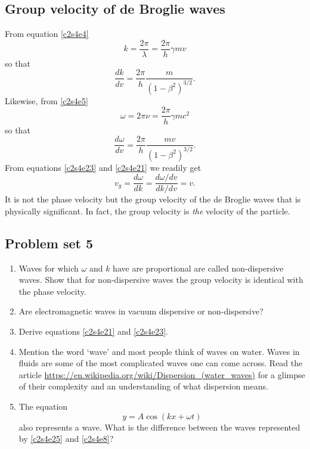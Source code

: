 \subsection{Group velocity of de Broglie waves}
From equation \eqref{c2s4e4}
\begin{equation}\label{c2s4e20}
k = \frac{2\pi}{\lambda} = \frac{2\pi}{h}\gamma mv
\end{equation}
so that
\begin{equation}\label{c2s4e21}
\frac{dk}{dv} = \frac{2\pi}{h}\frac{m}{(1 - \beta^2)^{3/2}}.
\end{equation}
Likewise, from \eqref{c2s4e5}
\begin{equation}\label{c2s4e22}
\omega = 2\pi\nu = \frac{2\pi}{h}\gamma mc^2
\end{equation}
so that
\begin{equation}\label{c2s4e23}
\frac{d\omega}{dv} = \frac{2\pi}{h}\frac{mv}{(1 - \beta^2)^{3/2}}.
\end{equation}
From equations \eqref{c2s4e23} and \eqref{c2s4e21} we readily get
\begin{equation}\label{c2s4e24}
v_g = \frac{d\omega}{dk} = \frac{d\omega/dv}{dk/dv} = v.
\end{equation}
It is not the phase velocity but the group velocity of the de Broglie waves
that is physically significant. In fact, the group velocity is \emph{the}
velocity of the particle.

\subsection{Problem set 5}
\begin{enumerate}
\item Waves for which $\omega$ and $k$ have are proportional are called
non-dispersive waves. Show that for non-dispersive waves the group velocity is
identical with the phase velocity.
\item Are electromagnetic waves in vacuum dispersive or non-dispersive?
\item Derive equations \eqref{c2s4e21} and \eqref{c2s4e23}.
\item Mention the word `wave' and most people think of waves on water. Waves
in fluids are some of the most complicated waves one can come across. Read 
the article \url{https://en.wikipedia.org/wiki/Dispersion_(water_waves)} for a
glimpse of their complexity and an understanding of what dispersion means.
\item The equation
\begin{equation}\label{c2s4e25}
y = A\cos(kx + \omega t)
\end{equation}
also represents a wave. What is the difference between the waves represented
by \eqref{c2s4e25} and \eqref{c2s4e8}?
\end{enumerate}

